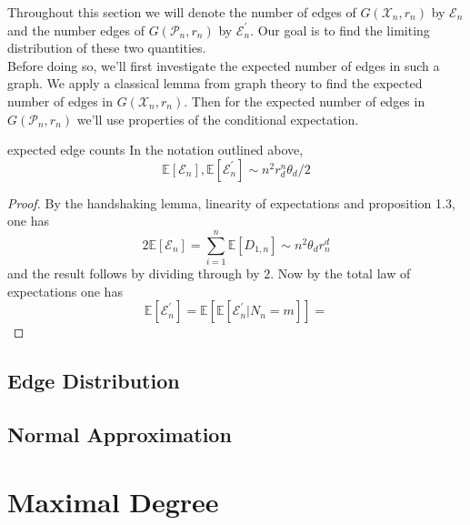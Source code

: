 \documentclass{article}
\begin{document}
Throughout this section we will denote the number of edges of $G(\mathcal{X}_n, r_n)$ by $\mathcal{E}_n$ and the 
number edges of $G(\mathcal{P}_n, r_n)$ by $\mathcal{E}^\prime_n$. Our goal is to find the limiting distribution of 
these two quantities. \\

Before doing so, we'll first investigate the expected number of edges in such a graph. We apply a classical lemma 
from graph theory to find the expected number of edges in $G(\mathcal{X}_n, r_n)$. Then for the expected number of 
edges in $G(\mathcal{P}_n, r_n)$ we'll use properties of the conditional expectation.

\begin{proposition}[]{expected edge counts}
    In the notation outlined above, 
    \[\mathbb{E}[\mathcal{E}_n], \mathbb{E}[\mathcal{E}_n^\prime] \sim n^2 r_d^n \theta_d / 2\]
\end{proposition}

\begin{proof}
    By the handshaking lemma, linearity of expectations and proposition 1.3, one has 
    \[2\mathbb{E}[\mathcal{E}_n] = \sum_{i=1}^n \mathbb{E}[D_{1, n}] \sim n^2 \theta_d r_n^d\]
    and the result follows by dividing through by $2$. Now by the total law of expectations one has 
    \[\mathbb{E}[\mathcal{E}^\prime_n] = \mathbb{E}[\mathbb{E}[\mathcal{E}_n^\prime | N_n = m]] 
    = \]
\end{proof}

\subsection{Edge Distribution}

\subsection{Normal Approximation}

\section{Maximal Degree}
\end{document}
